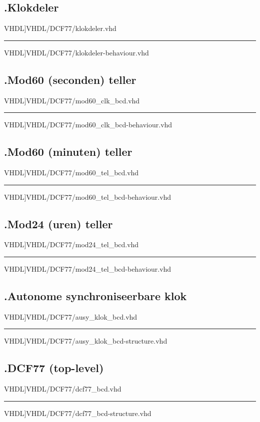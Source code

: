 \subsection*{\label{code: klokdeler}\thesubsection.\quad Klokdeler}
\scriptsize 
 VHDL]{VHDL/DCF77/klokdeler.vhd}
\hrule
 VHDL]{VHDL/DCF77/klokdeler-behaviour.vhd}
\normalsize

\subsection*{\label{code: mod60_clk}\thesubsection.\quad Mod60 (seconden) teller}
\scriptsize 
 VHDL]{VHDL/DCF77/mod60_clk_bcd.vhd}
\hrule
 VHDL]{VHDL/DCF77/mod60_clk_bcd-behaviour.vhd}
\normalsize

\subsection*{\label{code: mod60_tel}\thesubsection.\quad Mod60 (minuten) teller}
\scriptsize 
 VHDL]{VHDL/DCF77/mod60_tel_bcd.vhd}
\hrule
 VHDL]{VHDL/DCF77/mod60_tel_bcd-behaviour.vhd}
\normalsize

\subsection*{\label{code: mod24_tel}\thesubsection.\quad Mod24 (uren) teller}
\scriptsize 
 VHDL]{VHDL/DCF77/mod24_tel_bcd.vhd}
\hrule
 VHDL]{VHDL/DCF77/mod24_tel_bcd-behaviour.vhd}
\normalsize

\subsection*{\label{code: ausy_klok}\thesubsection.\quad Autonome synchroniseerbare klok}
\scriptsize 
 VHDL]{VHDL/DCF77/ausy_klok_bcd.vhd}
\hrule 
 VHDL]{VHDL/DCF77/ausy_klok_bcd-structure.vhd}
\normalsize

\subsection*{\label{code: dcf77}\thesubsection.\quad DCF77 (top-level)}
\scriptsize 
 VHDL]{VHDL/DCF77/dcf77_bcd.vhd}
\hrule
 VHDL]{VHDL/DCF77/dcf77_bcd-structure.vhd}
\normalsize
\newpage


